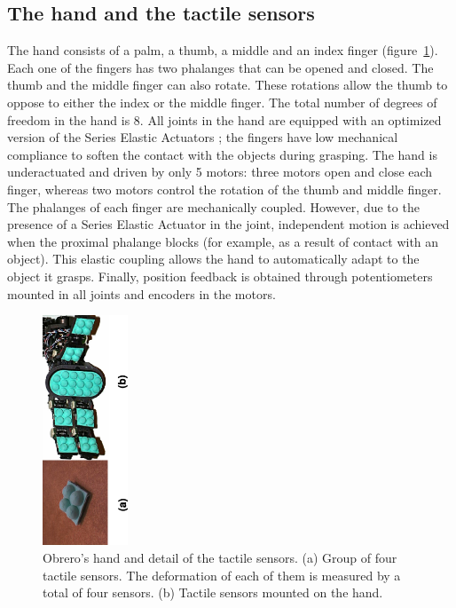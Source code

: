 \subsection{The hand and the tactile sensors}
%
The hand consists of a palm, a thumb, a middle and an index
finger (figure~\ref{fig:TactileSensors}). Each one of the fingers 
has two phalanges that can be opened and closed. The thumb and the middle finger can also
rotate. These rotations allow the thumb to oppose to either the
index or the middle finger. The total number of degrees of freedom
in the hand is 8. All joints in the hand are equipped with an
optimized version of the Series Elastic Actuators \cite{actuator};
the fingers have low mechanical compliance to soften the contact
with the objects during grasping.
The hand is underactuated and driven by only 5 motors:
three motors open and close each finger, whereas two motors
control the rotation of the thumb and middle finger. The
phalanges of each finger are mechanically coupled. However, due to the
presence of a Series Elastic Actuator in the joint, independent
motion is achieved when the proximal phalange blocks (for example,
as a result of contact with an object). This elastic coupling
allows the hand to automatically adapt to the object it grasps.
Finally, position feedback is obtained through potentiometers
mounted in all joints and encoders in the motors.
%
%
\begin{figure}[tbp]
\centerline{
\includegraphics[width=1.0in, angle=270 ]{./figures/Tactiles.eps}
} \caption{Obrero's hand and detail of the tactile sensors. (a) Group of four tactile sensors. The
deformation of each of them is measured by a total of four sensors.
(b) Tactile sensors mounted on the hand.} \label{fig:TactileSensors}
\end{figure}
